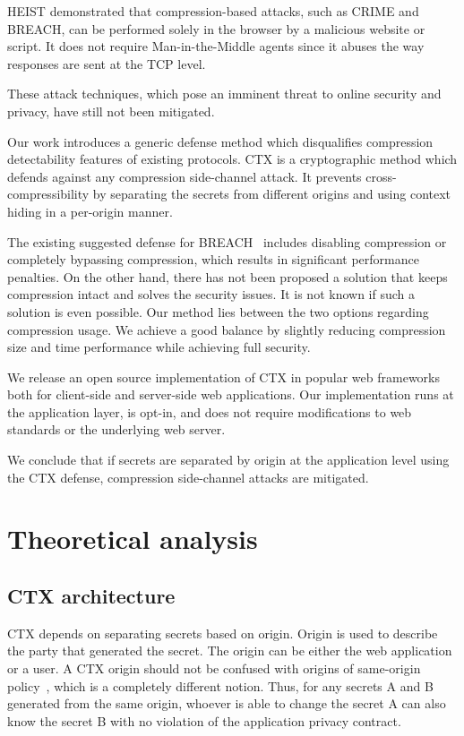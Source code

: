 \documentclass[a4paper, 11 pt, conference]{article}  %
\begin{document}
HEIST demonstrated that compression-based attacks, such as CRIME and BREACH, can
be performed solely in the browser by a malicious website or script. It does not
require Man-in-the-Middle agents since it abuses the way responses are sent at the TCP level.

These attack techniques, which pose an imminent threat to online security and privacy, have still not been mitigated.

Our work introduces a generic defense method which disqualifies compression
detectability features of existing protocols. CTX is a cryptographic method
which defends against any compression side-channel attack. It prevents
cross-compressibility by separating the secrets from different origins and using
context hiding in a per-origin manner.

The existing suggested defense for BREACH~\cite{c10} includes disabling
compression or completely bypassing compression, which results in significant
performance penalties. On the other hand, there has not been proposed a solution
that keeps compression intact and solves the security issues. It is not known if
such a solution is even possible. Our method lies between the two options
regarding compression usage. We achieve a good balance by slightly reducing
compression size and time performance while achieving full security.

We release an open source implementation of CTX in popular web frameworks both
for client-side and server-side web applications. Our implementation runs at the
application layer, is opt-in, and does not require modifications to web
standards or the underlying web server.

We conclude that if secrets are separated by origin at the application level using the CTX defense, compression side-channel attacks are mitigated.

\section{Theoretical analysis}

\subsection{CTX architecture}

CTX depends on separating secrets based on origin. Origin is used to describe
the party that generated the secret. The origin can be either the web
application or a user. A CTX origin should not be confused with origins of
same-origin policy~\cite{c11}, which is a completely different notion. Thus, for any secrets A and B generated from the same origin, whoever is able to change the secret A can also know the secret B with no violation of the application privacy contract.
\end{document}
